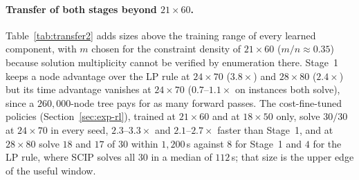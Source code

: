 \documentclass[preprint,12pt]{elsarticle}
\begin{document}
\paragraph{Transfer of both stages beyond $21\times60$.} Table~\ref{tab:transfer2} adds sizes above the training range of every learned component, with $m$ chosen for the constraint density of $21\times60$ ($m/n\approx0.35$) because solution multiplicity cannot be verified by enumeration there. Stage~1 keeps a node advantage over the LP rule at $24\times70$ ($3.8\times$) and $28\times80$ ($2.4\times$) but its time advantage vanishes at $24\times70$ ($0.7$--$1.1\times$ on instances both solve), since a $260{,}000$-node tree pays for as many forward passes. The cost-fine-tuned policies (Section~\ref{sec:exp-rl}), trained at $21\times60$ and at $18\times50$ only, solve $30/30$ at $24\times70$ in every seed, $2.3$--$3.3\times$ and $2.1$--$2.7\times$ faster than Stage~1, and at $28\times80$ solve $18$ and $17$ of $30$ within $1{,}200$\,s against $8$ for Stage~1 and $4$ for the LP rule, where SCIP solves all $30$ in a median of $112$\,s; that size is the upper edge of the useful window.

\begin{table}[h]
\centering
{}
\caption{Sizes above every training range, lattice off, $30$ instances each; solution multiplicity unverified, constraint density matched. Training sizes in parentheses.}
\label{tab:transfer2}
\end{table}
\end{document}

